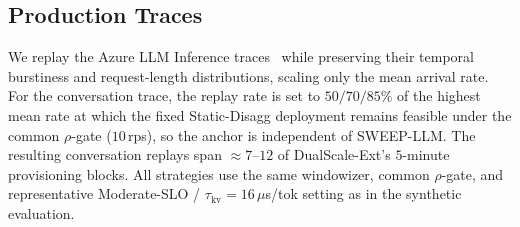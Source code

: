 \subsection{Production Traces}
\label{sec:eval_prod}

We replay the Azure LLM Inference traces~\cite{patel2024splitwise} while preserving their temporal burstiness and request-length distributions, scaling only the mean arrival rate.
For the conversation trace, the replay rate is set to $50/70/85\%$ of the highest mean rate at which the fixed Static-Disagg deployment remains feasible under the common $\rho$-gate ($10$\,rps), so the anchor is independent of SWEEP-LLM.
The resulting conversation replays span $\approx$$7$--$12$ of DualScale-Ext's $5$-minute provisioning blocks.
All strategies use the same windowizer, common $\rho$-gate, and representative Moderate-SLO / $\tau_{\mathrm{kv}}{=}16\,\mu$s/tok setting as in the synthetic evaluation.

